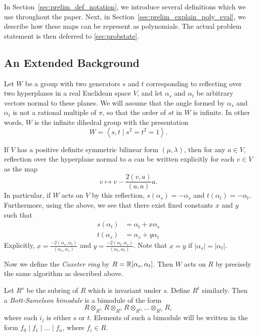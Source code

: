 In Section~\ref{sec:prelim_def_notation}, we introduce several definitions which we use throughout the paper.  Next, in Section~\ref{sec:prelim_explain_poly_eval}, we describe how these maps can be represent as polynomials.  The actual problem statement is then deferred to \ref{sec:probstate}.
\subsection{An Extended Background}
\label{sec:prelim_background}
Let $W$ be a group with two generators $s$ and $t$ corresponding to reflecting over two hyperplanes in a real Euclidean space $V$, and let $\alpha_s$ and $\alpha_t$ be arbitrary vectors normal to these planes.  We will assume that the angle formed by $\alpha_s$ and $\alpha_t$ is not a rational multiple of $\pi$, so that the order of $st$ in $W$ is infinite.  In other words, $W$ is the infinite dihedral group with the presentation \[ W = \left<s,t \mid s^2=t^2=1\right>. \] 

If $V$ has a positive definite symmetric bilinear form $(\mu, \lambda)$, then for any $a \in V$, reflection over the hyperplane normal to $a$ can be written explicitly for each $v \in V$ as the map \[ v \mapsto v - \frac{2(v,a)}{(a,a)} a. \]  
In particular, if $W$ acts on $V$ by this reflection, $s(\alpha_s) = -\alpha_s$ and $t(\alpha_t) = -\alpha_t$.  Furthermore, using the above, we see that there exist fixed constants $x$ and $y$ such that
\begin{align*}
	s(\alpha_t) &= \alpha_t + x \alpha_s \\
	t(\alpha_s) &= \alpha_s + y \alpha_t
\end{align*}
Explicitly, $x = \frac{-2(\alpha_s,\alpha_t)}{(\alpha_s, \alpha_s)}$ and $y = \frac{-2(\alpha_t,\alpha_s)}{(\alpha_t,\alpha_t)}$.  Note that $x=y$ if $\left\lvert \alpha_s \right\rvert = \left\lvert \alpha_t \right\rvert$.

Now we define the \emph{Coxeter ring} by $R = \mathbb R[\alpha_s, \alpha_t]$.  Then $W$ acts on $R$ by precisely the same algorithm as described above.

Let $R^s$ be the subring of $R$ which is invariant under $s$.  Define $R^t$ similarly.  Then a \emph{Bott-Samelson bimodule} is a bimodule of the form
\[ R \otimes_{R^{i_1}} R \otimes_{R^{i_2}} R \otimes_{R^{i_3}} \dots \otimes_{R^{i_n}} R, \]
where each $i_j$ is either $s$ or $t$.   Elements of such a bimodule will be written in the form $f_0 \mid f_1 \mid \dots \mid f_n$, where $f_i \in R$.

